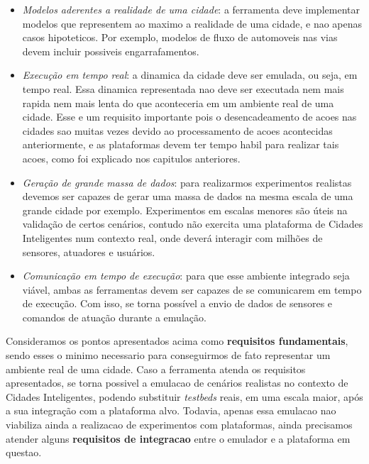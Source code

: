 \begin{itemize}
    \item \textit{Modelos aderentes a realidade de uma cidade}: a ferramenta deve implementar modelos que representem ao maximo a realidade de uma cidade, e nao apenas casos hipoteticos.
        Por exemplo, modelos de fluxo de automoveis nas vias devem incluir possiveis engarrafamentos.

    \item \textit{Execução em tempo real}: a dinamica da cidade deve ser emulada, ou seja, em tempo real. Essa dinamica representada nao deve ser executada nem mais rapida nem mais lenta do que
        aconteceria em um ambiente real de uma cidade.
        Esse e um requisito importante pois o desencadeamento de acoes nas cidades sao muitas vezes devido ao processamento de acoes acontecidas anteriormente, e as plataformas
        devem ter tempo habil para realizar tais acoes, como foi explicado nos capitulos anteriores.

    \item \textit{Geração de grande massa de dados}: para realizarmos experimentos realistas devemos ser capazes de gerar uma massa de dados na mesma escala de uma grande cidade por
        exemplo.
        Experimentos em escalas menores são úteis na validação de certos cenários, contudo não exercita uma plataforma de Cidades Inteligentes num contexto real, onde deverá
        interagir com milhões de sensores, atuadores e usuários.

    \item \textit{Comunicação em tempo de execução}: para que esse ambiente integrado seja viável, ambas as ferramentas devem ser capazes de se comunicarem em tempo de execução.
        Com isso, se torna possível a envio de dados de sensores e comandos de atuação durante a emulação.
\end{itemize}

Consideramos os pontos apresentados acima como \textbf{requisitos fundamentais}, sendo esses o minimo necessario para conseguirmos de fato representar um ambiente real de uma cidade.
Caso a ferramenta atenda os requisitos apresentados, se torna possivel a emulacao de cenários realistas no contexto de Cidades Inteligentes, podendo substituir \textit{testbeds}
reais, em uma escala maior, após a sua integração com a plataforma alvo.
Todavia, apenas essa emulacao nao viabiliza ainda a realizacao de experimentos com plataformas, ainda precisamos atender alguns \textbf{requisitos de integracao} entre o emulador
e a plataforma em questao.

